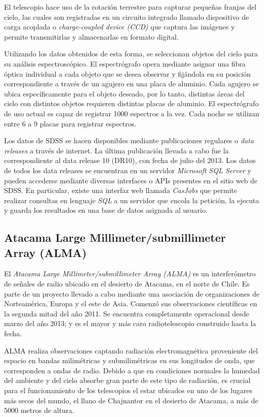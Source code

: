 El telescopio hace uso de la rotación terrestre para capturar pequeñas franjas del cielo, las cuales son registradas en un circuito integrado llamado dispositivo de carga acoplada o \textit{charge-coupled device (CCD)} que captura las imágenes y permite transmitirlas y almacenarlas en formato digital.

Utilizando los datos obtenidos de esta forma, se seleccionan objetos del cielo para su análisis espectroscópico. El espectrógrafo opera mediante asignar una fibra óptica individual a cada objeto que se desea observar y fijándola en su posición correspondiente a través de un agujero en una placa de aluminio. Cada agujero se ubica específicamente para el objeto deseado, por lo tanto, distintas áreas del cielo con distintos objetos requieren distintas placas de aluminio. El espectrógrafo de uso actual es capaz de registrar 1000 espectros a la vez. Cada noche se utilizan entre 6 a 9 placas para registrar espectros.

Los datos de SDSS se hacen disponibles mediante publicaciones regulares o \textit{data releases} a través de internet. La última publicación llevada a cabo fue la correspondiente al data release 10 (DR10), con fecha de julio del 2013. Los datos de todos los data releases se encuentran en un servidor \textit{Microsoft SQL Server} y pueden accederse mediante diversas interfaces o APIs presentes en el sitio web de SDSS. En particular, existe una interfaz web llamada \textit{CasJobs} que permite realizar consultas en lenguaje \textit{SQL} a un servidor que encola la petición, la ejecuta y guarda los resultados en una base de datos asignada al usuario.

\subsection{Atacama Large Millimeter/submillimeter Array (ALMA)}

El \textit{Atacama Large Millimeter/submillimeter Array (ALMA)} es un interferómetro de señales de radio ubicado en el desierto de Atacama, en el norte de Chile. Es parte de un proyecto llevado a cabo mediante una asociación de organizaciones de Norteamérica, Europa y el este de Asia. Comenzó sus observaciones científicas en la segunda mitad del año 2011. Se encuentra completamente operacional desde marzo del año 2013; y es el mayor y más caro radiotelescopio construido hasta la fecha.

ALMA realiza observaciones captando radiación electromagnética proveniente del espacio en bandas milimétricas y submilimétricas en sus longitudes de onda, que corresponden a ondas de radio. Debido a que en condiciones normales la humedad del ambiente y del cielo absorbe gran parte de este tipo de radiación, es crucial para el funcionamiento de los telescopios el estar ubicados en uno de los lugares más secos del mundo, el llano de Chajnantor en el desierto de Atacama, a más de 5000 metros de altura. 

